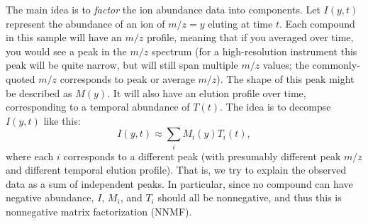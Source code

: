 \documentclass[notitlepage]{revtex4-1}
\begin{document}
The main idea is to \emph{factor} the ion abundance data into components.  Let $I(y,t)$ represent the abundance of an ion of $m/z = y$ eluting at time $t$.  Each compound in this sample will have an $m/z$ profile, meaning that if you averaged over time, you would see a peak in the $m/z$ spectrum (for a high-resolution instrument this peak will be quite narrow, but will still span multiple $m/z$ values; the commonly-quoted $m/z$ corresponds to peak or average $m/z$).  The shape of this peak might be described as $M(y)$.  It will also have an elution profile over time, corresponding to a temporal abundance of $T(t)$.  The idea is to decompse $I(y,t)$ like this:
\begin{equation}
I(y,t) \approx \sum_i M_i(y) T_i(t),
\end{equation}
where each $i$ corresponds to a different peak (with presumably different peak $m/z$ and different temporal elution profile).  That is, we try to explain the observed data as a sum of independent peaks.  In particular, since no compound can have negative abundance, $I$, $M_i$, and $T_i$ should all be nonnegative, and thus this is nonnegative matrix factorization (NNMF).
\end{document}
